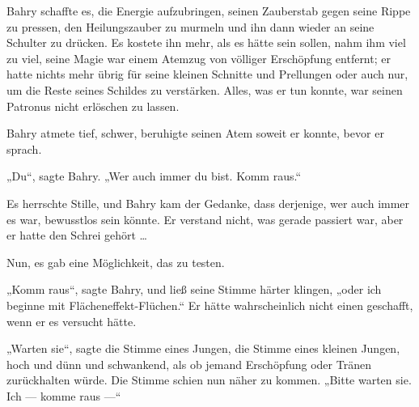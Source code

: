 Bahry schaffte es, die Energie aufzubringen, seinen Zauberstab gegen seine Rippe zu pressen, den Heilungszauber zu murmeln und ihn dann wieder an seine Schulter zu drücken. Es kostete ihn mehr, als es hätte sein sollen, nahm ihm viel zu viel, seine Magie war einem Atemzug von völliger Erschöpfung entfernt; er hatte nichts mehr übrig für seine kleinen Schnitte und Prellungen oder auch nur, um die Reste seines Schildes zu verstärken. Alles, was er tun konnte, war seinen Patronus nicht erlöschen zu lassen.

Bahry atmete tief, schwer, beruhigte seinen Atem soweit er konnte, bevor er sprach.

„Du“, sagte Bahry.
„Wer auch immer du bist. Komm raus.“

Es herrschte Stille, und Bahry kam der Gedanke, dass derjenige, wer auch immer es war, bewusstlos sein könnte. Er verstand nicht, was gerade passiert war, aber er hatte den Schrei gehört …

Nun, es gab eine Möglichkeit, das zu testen.

„Komm raus“, sagte Bahry, und ließ seine Stimme härter klingen, „oder ich beginne mit Flächeneffekt-Flüchen.“ Er hätte wahrscheinlich nicht einen geschafft, wenn er es versucht hätte.

„Warten sie“, sagte die Stimme eines Jungen, die Stimme eines kleinen Jungen, hoch und dünn und schwankend, als ob jemand Erschöpfung oder Tränen zurückhalten würde. Die Stimme schien nun näher zu kommen.
„Bitte warten sie. Ich — komme raus —“

